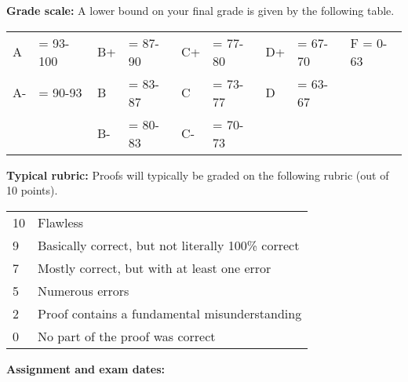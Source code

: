 \documentclass[12pt]{article}
\begin{document}
\vspace*{.15in}
\noindent\textbf{Grade scale:}
A lower bound on your final grade is given by the following table.

\begin{center}
 \begin{tabular}{|ll|ll|ll|ll|l|}
\hline
A &\hspace{-3 pt}\hspace{-7 pt}= 93-100 &B+ &\hspace{-7 pt}= 87-90 &C+ &\hspace{-7 pt}= 77-80 & D+ &\hspace{-7 pt}= 67-70 & F = 0-63\\
A- &\hspace{-3 pt}\hspace{-7 pt}= 90-93 &B &\hspace{-7 pt}= 83-87 & C &\hspace{-7 pt}= 73-77 & D &\hspace{-7 pt}= 63-67 &\\
 & &B- &\hspace{-7 pt}= 80-83 &C- &\hspace{-7 pt}= 70-73 & & &\\
 \hline
 \end{tabular}
\end{center}

\vspace*{.15in}
\noindent\begin{minipage}{\textwidth}
\noindent\textbf{Typical rubric:}
Proofs will typically be graded on the following rubric (out of 10 points).

  \begin{center}
   \begin{tabular}{|l|l|}
   \hline
   10& Flawless\\
   9& Basically correct, but not literally 100\% correct\\
   7& Mostly correct, but with at least one error\\
   5& Numerous errors\\
   2& Proof contains a fundamental misunderstanding\\
   0& No part of the proof was correct\\
   \hline
   \end{tabular}
  \end{center}
\end{minipage}

\noindent\textbf{Assignment and exam dates:}
\end{document}
